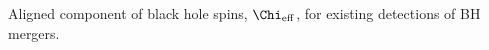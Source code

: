  \label{fig:BHspin} Aligned component of black hole spins, $\Chi_{\rm eff}$, for existing detections of  BH mergers.